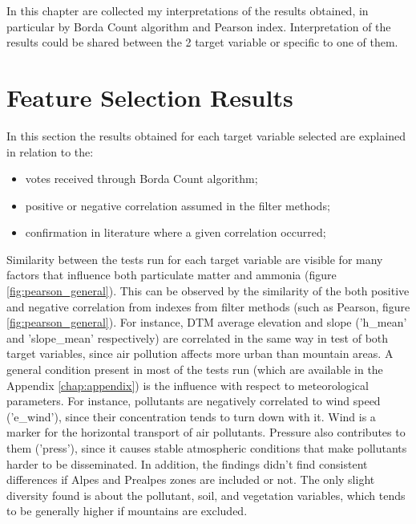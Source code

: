 In this chapter are collected my interpretations of the results obtained, in particular by Borda Count algorithm and Pearson index. Interpretation of the results could be shared between the 2 target variable or specific to one of them.

\section{Feature Selection Results}
In this section the results obtained for each target variable selected are explained in relation to the:
\begin{itemize}
    \item votes received through Borda Count algorithm;
    \item positive or negative correlation assumed in the filter methods;
    \item confirmation in literature where a given correlation occurred; 
\end{itemize}
Similarity between the tests run for each target variable are visible for many factors that influence both particulate matter and ammonia (figure \ref{fig:pearson_general}).
This can be observed by the similarity of the both positive and negative correlation from indexes from filter methods (such as Pearson, figure \ref{fig:pearson_general}). 
For instance, DTM average elevation and slope ('h\_mean' and 'slope\_mean' respectively) are correlated in the same way in test of both target variables, since air pollution affects more urban than mountain areas.
A general condition present in most of the tests run (which are available in the Appendix \ref{chap:appendix}) is the influence with respect to meteorological parameters.
For instance, pollutants are negatively correlated to wind speed ('e\_wind'), since their concentration tends to turn down with it. Wind is a marker for the horizontal transport of air pollutants. Pressure also contributes to them ('press'), since it causes stable atmospheric conditions that make pollutants harder to be disseminated. 
In addition, the findings didn't find consistent differences if Alpes and Prealpes zones are included or not. The only slight diversity found is about the pollutant, soil, and vegetation variables, which tends to be generally higher if mountains are excluded.

